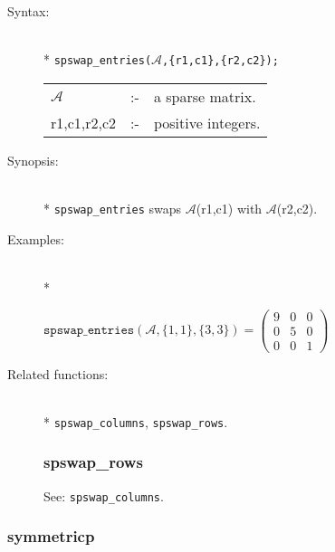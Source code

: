 \begin{description}
\item[Syntax:]\mbox{}\\*
\texttt{spswap\_entries($\mathcal{A}$,\{r1,c1\},\{r2,c2\});}\\[2mm]
\begin{tabular}{l l l} 
$\mathcal{A}$  &:-& a sparse matrix. \\
r1,c1,r2,c2 &:-& positive integers.
\end{tabular}

\item[Synopsis:]\mbox{}\\*
\texttt{spswap\_entries} swaps $\mathcal{A}$(r1,c1) with 
                $\mathcal{A}$(r2,c2).

\item[Examples:]\mbox{}\\*
\begin{flushleft}  
\begin{math}  
\texttt{spswap\_entries}(\mathcal{A},\{1,1\},\{3,3\}) =
        \begin{pmatrix} 9 & 0 & 0 \\ 0 & 5 & 0 \\ 0 & 0 & 1 \end{pmatrix} 
\end{math}  
\end{flushleft}

\item[Related functions:]\mbox{}\\*
\texttt{spswap\_columns}, \texttt{spswap\_rows}.


\subsubsection{spswap\_rows}
\label{sparse:spswap_rows}
See: \texttt{spswap\_columns}.
\end{description}

\subsubsection{symmetricp}
\label{sparse:symmetricp}

